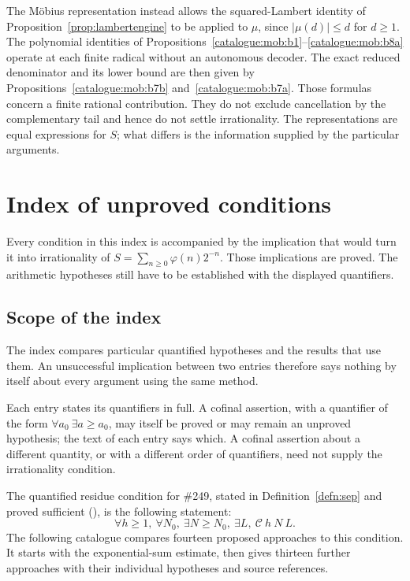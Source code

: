 \documentclass[11pt]{article}
\theoremstyle{plain}
\theoremstyle{definition}
\theoremstyle{remark}
\newcommand{\lean}[2]{\leanlink{#2}}
\begin{document}
The M\"obius representation instead allows the squared-Lambert identity
of Proposition~\ref{prop:lambertengine}
to be applied to $\mu$, since $|\mu(d)|\le d$ for $d\ge1$. The
polynomial identities of
Propositions~\ref{catalogue:mob:b1}--\ref{catalogue:mob:b8a}
operate at each finite radical without an autonomous decoder. The exact
reduced denominator and its lower bound are then given by
Propositions~\ref{catalogue:mob:b7b} and~\ref{catalogue:mob:b7a}.
Those formulas concern a finite rational contribution. They do not
exclude cancellation by the complementary tail and hence do not settle
irrationality. The representations are equal expressions for $S$;
what differs is the information supplied by the particular arguments.
\section{Index of unproved conditions}

Every condition in this index is accompanied by the implication that
would turn it into irrationality of $S=\sum_{n\ge0}\varphi(n)2^{-n}$.
Those implications are proved. The arithmetic hypotheses still have
to be established with the displayed quantifiers.

\subsection{Scope of the index}

The index compares particular quantified hypotheses and the results
that use them. An unsuccessful implication between two entries
therefore says nothing by itself about every argument using the same
method.

Each entry states its quantifiers in full. A cofinal assertion, with a
quantifier of the form $\forall a_0\ \exists a\ge a_0$, may itself be
proved or may remain an unproved hypothesis; the text of each entry says
which. A cofinal assertion about a different quantity, or with a
different order of quantifiers, need not supply the irrationality
condition.

The quantified residue condition for \#249, stated in Definition~\ref{defn:sep} and proved sufficient
(\lean{irrational_totient_series_of_certificate_supply}{TotientTailPeriodKiller.lean:394}), is the
following statement:
\[
  \forall h \ge 1,\ \forall N_0,\ \exists N \ge N_0,\ \exists L,\ \mathcal{C}\ h\ N\ L .
\]
The following catalogue compares fourteen proposed approaches to this
condition. It starts with the exponential-sum estimate, then gives thirteen
further approaches with their individual hypotheses and source references.
\end{document}
